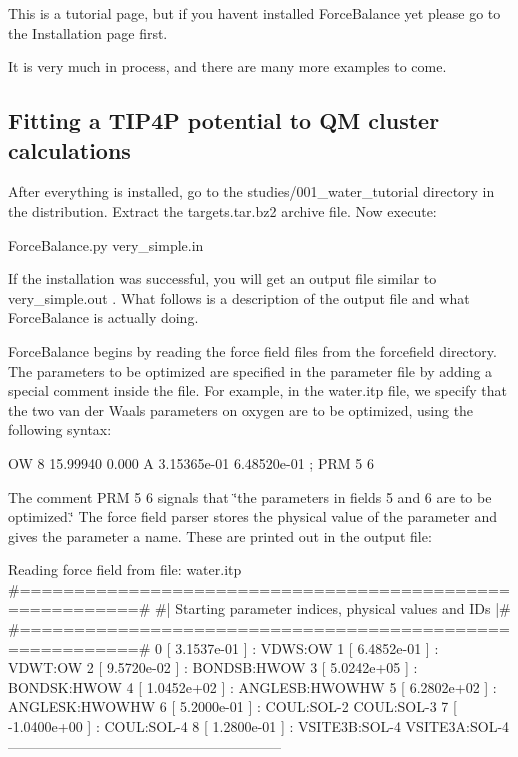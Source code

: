 This is a tutorial page, but if you haven\textquotesingle{}t installed Force\+Balance yet please go to the Installation page first.

It is very much in process, and there are many more examples to come.\hypertarget{tutorial_tip4p}{}\subsection{Fitting a T\+I\+P4\+P potential to Q\+M cluster calculations}\label{tutorial_tip4p}
After everything is installed, go to the {\ttfamily studies/001\+\_\+water\+\_\+tutorial} directory in the distribution. Extract the {\ttfamily targets.\+tar.\+bz2} archive file. Now execute\+:

\begin{DoxyVerb} ForceBalance.py very_simple.in\end{DoxyVerb}


If the installation was successful, you will get an output file similar to {\ttfamily very\+\_\+simple.\+out} . What follows is a description of the output file and what Force\+Balance is actually doing.

Force\+Balance begins by reading the force field files from the {\ttfamily forcefield} directory. The parameters to be optimized are specified in the parameter file by adding a special comment inside the file. For example, in the {\ttfamily water.\+itp} file, we specify that the two van der Waals parameters on oxygen are to be optimized, using the following syntax\+:

\begin{DoxyVerb} OW     8     15.99940     0.000       A    3.15365e-01  6.48520e-01 ; PRM 5 6\end{DoxyVerb}


The comment {\ttfamily P\+RM 5 6} signals that \char`\"{}the parameters in fields 5
 and 6 are to be optimized.\char`\"{} The force field parser stores the physical value of the parameter and gives the parameter a name. These are printed out in the output file\+:

\begin{DoxyVerb} Reading force field from file: water.itp
 #=========================================================#
 #|  Starting parameter indices, physical values and IDs  |#
 #=========================================================#
    0 [  3.1537e-01 ] : VDWS:OW
    1 [  6.4852e-01 ] : VDWT:OW
    2 [  9.5720e-02 ] : BONDSB:HWOW
    3 [  5.0242e+05 ] : BONDSK:HWOW
    4 [  1.0452e+02 ] : ANGLESB:HWOWHW
    5 [  6.2802e+02 ] : ANGLESK:HWOWHW
    6 [  5.2000e-01 ] : COUL:SOL-2 COUL:SOL-3
    7 [ -1.0400e+00 ] : COUL:SOL-4
    8 [  1.2800e-01 ] : VSITE3B:SOL-4 VSITE3A:SOL-4
 -----------------------------------------------------------\end{DoxyVerb}


